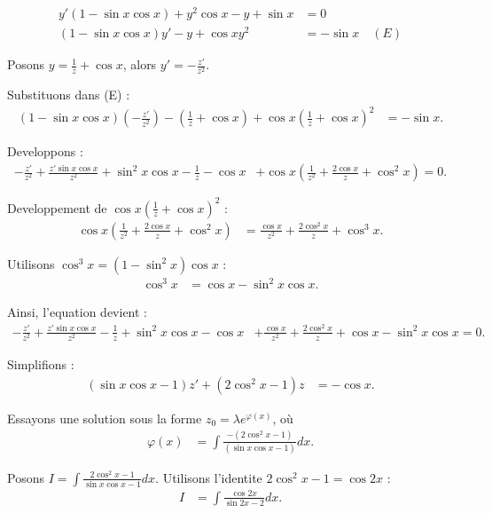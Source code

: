 \begin{align*}
	y' (1 - \sin x \cos x) + y^2 \cos x - y + \sin x &= 0 \\
	(1 - \sin x \cos x)y' - y + \cos x y^2 &= - \sin x \quad (E)
\end{align*}

Posons $y = \frac{1}{z} + \cos x$, alors $y' = - \frac{z'}{z^2}$.

Substituons dans (E) :
\begin{align*}
	(1 - \sin x \cos x)\left(-\frac{z'}{z^2}\right) - \left(\frac{1}{z} + \cos x\right) + \cos x \left(\frac{1}{z} + \cos x\right)^2 &= - \sin x.
\end{align*}

Developpons :
\begin{align*}
	-\frac{z'}{z^2} + \frac{z' \sin x \cos x}{z^2} + \sin^2 x \cos x - \frac{1}{z} - \cos x &+ \cos x \left(\frac{1}{z^2} + \frac{2 \cos x}{z} + \cos^2 x \right) = 0.
\end{align*}

Developpement de $\cos x \left(\frac{1}{z} + \cos x \right)^2$ :
\begin{align*}
	\cos x \left( \frac{1}{z^2} + \frac{2 \cos x}{z} + \cos^2 x \right) &= \frac{\cos x}{z^2} + \frac{2 \cos^2 x}{z} + \cos^3 x.
\end{align*}

Utilisons $\cos^3 x = (1 - \sin^2 x) \cos x$ :
\begin{align*}
	\cos^3 x &= \cos x - \sin^2 x \cos x.
\end{align*}

Ainsi, l’equation devient :
\begin{align*}
	- \frac{z'}{z^2} + \frac{z' \sin x \cos x}{z^2} - \frac{1}{z} + \sin^2 x \cos x - \cos x &+ \frac{\cos x}{z^2} + \frac{2 \cos^2 x}{z} + \cos x - \sin^2 x \cos x = 0.
\end{align*}

Simplifions :
\begin{align*}
	(\sin x \cos x - 1) z' + (2 \cos^2 x - 1) z &= - \cos x.
\end{align*}

Essayons une solution sous la forme $z_0 = \lambda e^{\varphi(x)}$, où
\begin{align*}
	\varphi(x) &= \int \frac{- (2 \cos^2 x - 1)}{(\sin x \cos x - 1)} dx.
\end{align*}

Posons $I = \int \frac{2 \cos^2 x - 1}{\sin x \cos x - 1} dx$.
Utilisons l’identite $2 \cos^2 x - 1 = \cos 2x$ :
\begin{align*}
	I &= \int \frac{\cos 2x}{\sin 2x - 2} dx.
\end{align*}

